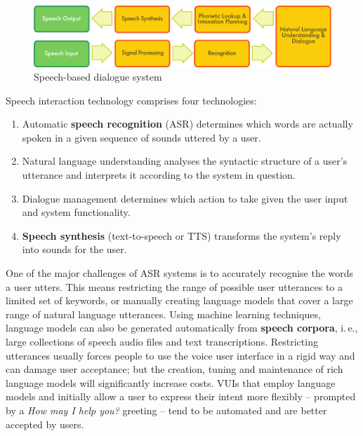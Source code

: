 \begin{multicols}{2}
\begin{figure}[htb]
  \center
  \includegraphics[width=\textwidth]{../_media/english/simple_speech-based_dialogue_architecture}
  \caption{Speech-based dialogue system}
  \label{fig:dialoguearch_en}
\end{figure}

Speech interaction technology comprises four technologies: 

\begin{enumerate}
\item Automatic \textbf{speech recognition} (ASR) determines which words are actually spoken in a given sequence of sounds uttered by a user.  
\item Natural language understanding analyses the syntactic structure of a user’s utterance and interprets it according to the system in question.
\item Dialogue management determines which action to take given the user input and system functionality.   
\item \textbf{Speech synthesis} (text-to-speech or TTS) transforms the system’s reply into sounds for the user.
\end{enumerate}

One of the major challenges of ASR systems is to accurately recognise the words a user utters. This means restricting the range of possible user utterances to a limited set of keywords, or manually creating language models that cover a large range of natural language utterances. Using machine learning techniques, language models can also be generated automatically from \textbf{speech corpora}, i.\,e., large collections of speech audio files and text transcriptions. Restricting utterances usually forces people to use the voice user interface in a rigid way and can damage user acceptance; but the creation, tuning and maintenance of rich language models will significantly increase costs. VUIs that employ language models and initially allow a user to express their intent more flexibly -- prompted by a \textit{How may I help you?} greeting -- tend to be automated and are better accepted by users.


\end{multicols}
